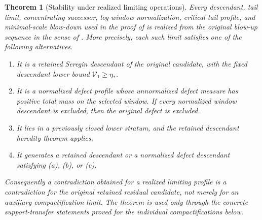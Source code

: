 \documentclass[11pt]{amsart}
\numberwithin{equation}{section}
\theoremstyle{plain}
\newtheorem{theorem}{Theorem}[section]
\theoremstyle{definition}
\theoremstyle{remark}
\newcommand{\Vel}{\mathcal V}
\begin{document}
\begin{theorem}[Stability under realized limiting operations]
\label{thm:ancestor-realization-inheritance}
Every descendant, tail limit, concentrating successor, log-window normalization,
critical-tail profile, and minimal-scale blow-down used in the proof of
 is realized from the original blow-up sequence in the
sense of .  More precisely, each
such limit satisfies one of the following alternatives.
\begin{enumerate}[label=\textup{(\alph*)}]
   \item It is a retained Seregin descendant of the original candidate, with
   the fixed descendant lower bound \(\Vel_1\ge\eta_*\).
   \item It is a normalized defect profile whose unnormalized defect
   measure has positive total mass on the selected window.  If every normalized
   window descendant is excluded, then the original defect is excluded.
   \item It lies in a previously closed lower stratum, and the retained
   descendant heredity theorem applies.
   \item It generates a retained descendant or a normalized defect descendant
   satisfying \textup{(a)}, \textup{(b)}, or \textup{(c)}.
\end{enumerate}
Consequently a contradiction obtained for a realized limiting profile is a
contradiction for the original retained residual candidate, not merely for an
auxiliary compactification limit.
The theorem is used only through the concrete support-transfer statements
proved for the individual compactifications below.
\end{theorem}
\end{document}
